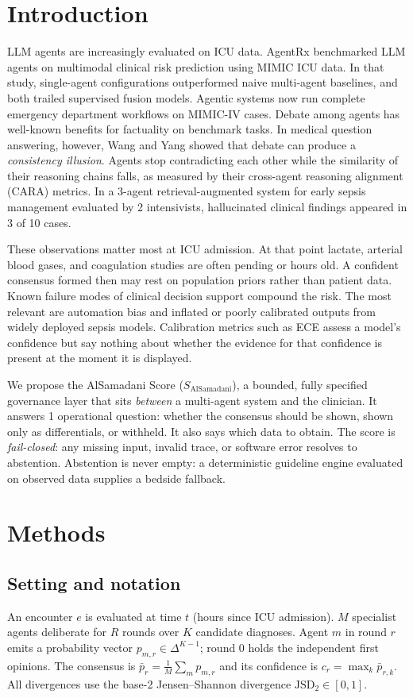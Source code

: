 \documentclass[11pt]{article}
\newcommand{\Sal}{S_{\mathrm{AlSamadani}}}
\newcommand{\JSD}{\mathrm{JSD}_2}
\begin{document}
\section{Introduction}
LLM agents are increasingly evaluated on ICU data. AgentRx benchmarked LLM agents on multimodal clinical risk
prediction using MIMIC ICU data. In that study, single-agent configurations outperformed naive multi-agent baselines,
and both trailed supervised fusion models.\cite{agentrx} Agentic systems now run complete emergency department workflows
on MIMIC-IV cases.\cite{mira} Debate among agents has well-known benefits for factuality on benchmark tasks.\cite{du2024}
In medical question answering, however, Wang and Yang showed that debate can produce a \emph{consistency illusion}.
Agents stop contradicting each other while the similarity of their reasoning chains falls, as measured by their
cross-agent reasoning alignment (CARA) metrics.\cite{wangyang}
In a 3-agent retrieval-augmented system for early sepsis management evaluated by 2 intensivists,
hallucinated clinical findings appeared in 3 of 10 cases.\cite{iapascurta}

These observations matter most at ICU admission. At that point lactate, arterial blood gases, and coagulation
studies are often pending or hours old. A confident consensus formed then may rest on population priors rather than
patient data. Known failure modes of clinical decision support compound the risk. The most relevant are automation bias\cite{goddard} and
inflated or poorly calibrated outputs from widely deployed sepsis models.\cite{wong2021} Calibration metrics such as ECE\cite{guo2017} assess a model's
confidence but say nothing about whether the evidence for that confidence is present at the moment it is displayed.

We propose the AlSamadani Score ($\Sal$), a bounded, fully specified governance layer that sits
\emph{between} a multi-agent system and the clinician. It answers 1 operational question: whether the consensus should be
shown, shown only as differentials, or withheld. It also says which data to obtain. The score is \emph{fail-closed}:
any missing input, invalid trace, or software error resolves to abstention. Abstention is never empty: a deterministic
guideline engine evaluated on observed data supplies a bedside fallback.

\section{Methods}
\subsection{Setting and notation}
An encounter $e$ is evaluated at time $t$ (hours since ICU admission). $M$ specialist agents
deliberate for $R$ rounds over $K$ candidate diagnoses. Agent $m$ in round $r$ emits a probability vector
$p_{m,r}\in\Delta^{K-1}$; round 0 holds the independent first opinions. The consensus is
$\bar p_r=\tfrac1M\sum_m p_{m,r}$ and its confidence is $c_r=\max_k \bar p_{r,k}$. All divergences use the base-2
Jensen--Shannon divergence $\JSD\in[0,1]$.\cite{lin1991}
\end{document}
